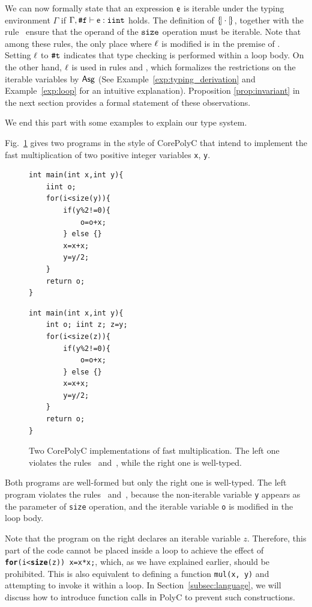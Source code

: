 \documentclass[runningheads]{llncs}
\begin{document}
We can now formally state that an expression $\mathsf{e}$ is iterable under the typing environment $\Gamma$ if $\Gamma,\texttt{\#}\mathtt{f}\vdash\mathsf{e}:\mathtt{iint}$ holds.
The definition of $\{\!|\cdot|\!\}_{}$, together with the rule~ ensure that the operand of the $\mathtt{size}$ operation must be iterable.
Note that among these rules, the only place where $\ell$ is modified is in the premise of . Setting $\ell$ to $\texttt{\#}\mathtt{t}$ indicates that type checking is performed within a loop body.
On the other hand, $\ell$ is used in rules  and , which formalizes the restrictions on the iterable variables by $\mathsf{Asg}$ (See Example~\ref{exp:typing_derivation} and Example~\ref{exp:loop} for an intuitive explanation).
Proposition \ref{prop:invariant} in the next section provides a formal statement of these observations.

We end this part with some examples to explain our type system.
\begin{example}
\label{example:fast-mul}
 Fig.~\ref{fig:mul} gives two programs in the style of CorePolyC that intend to implement the fast multiplication of two positive integer variables \texttt{x}, \texttt{y}.
\begin{figure}[t]
\begin{minipage}{0.45\linewidth}
\centering
\begin{lstlisting}[xleftmargin=1em,xrightmargin=1em]
int main(int x,int y){
    iint o;
    for(i<size(y)){
        if(y%2!=0){
            o=o+x;
        } else {}
        x=x+x;
        y=y/2;
    }
    return o;
}
\end{lstlisting}
\end{minipage}
\hspace{10mm}
\begin{minipage}{0.45\linewidth}
\centering
\begin{lstlisting}[xleftmargin=1em,xrightmargin=1em]
int main(int x,int y){
    int o; iint z; z=y;
    for(i<size(z)){
        if(y%2!=0){
            o=o+x;
        } else {}
        x=x+x;
        y=y/2;
    }
    return o;
}
\end{lstlisting}
\end{minipage}
\caption{Two CorePolyC implementations of fast multiplication. 
The left one violates the rules~ and~, while the right one is well-typed.}
\label{fig:mul}
\end{figure}
Both programs are  well-formed but only the right one is well-typed. The left program violates the rules~ and~, because the non-iterable variable \texttt{y} appears as the parameter of \texttt{size} operation, and the iterable variable \texttt{o} is modified in the loop body.

Note that the program on the right declares an iterable variable $z$.
Therefore, this part of the code cannot be placed inside a loop to achieve the effect of \texttt{\textbf{for}(i<\textbf{size}(z)) x=x*x;}, which, as we have explained earlier, should be prohibited.
This is also equivalent to defining a function \texttt{mul(x, y)} and attempting to invoke it within a loop.
In Section~\ref{subsec:language}, we will discuss how to introduce function calls in PolyC to prevent such constructions.
\end{example}
\end{document}

